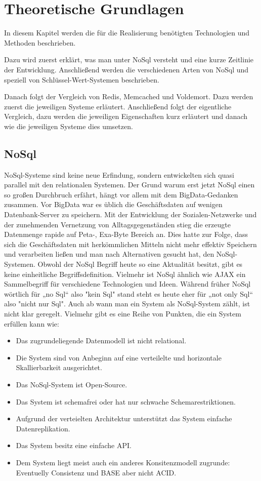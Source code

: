\chapter{Theoretische Grundlagen}
In diesem Kapitel werden die für die Realisierung benötigten Technologien und
Methoden beschrieben.

Dazu wird zuerst erklärt, was man unter NoSql versteht und eine kurze Zeitlinie
der Entwicklung. Anschließend werden die verschiedenen Arten von NoSql und
speziell von Schlüssel-Wert-Systemen beschrieben.

Danach folgt der Vergleich von Redis, Memcached und Voldemort. Dazu werden
zuerst die jeweiligen Systeme erläutert. Anschließend folgt der eigentliche
Vergleich, dazu werden die jeweiligen Eigenschaften kurz erläutert und danach
wie die jeweiligen Systeme dies umsetzen.

\section{NoSql}
NoSql-Systeme sind keine neue Erfindung, sondern entwickelten sich quasi
parallel mit den relationalen Systemen. Der Grund warum erst jetzt NoSql einen
so großen Durchbruch erfährt, hängt vor allem mit dem BigData-Gedanken zusammen.
Vor BigData war es üblich die Geschäftsdaten auf wenigen Datenbank-Server zu
speichern. Mit der Entwicklung der Sozialen-Netzwerke und der zunehmenden
Vernetzung von Alltagsgegenständen stieg die erzeugte Datenmenge rapide auf
Peta-, Exa-Byte Bereich an. Dies hatte zur Folge, dass sich die Geschäftsdaten
mit herkömmlichen Mitteln nicht mehr effektiv Speichern und verarbeiten ließen
und man nach Alternativen gesucht hat, den NoSql-Systemen.
Obwohl der NoSql Begriff heute so eine Aktualität besitzt, gibt es keine
einheitliche Begriffsdefinition. Vielmehr ist NoSql ähnlich wie \gls{AJAX} ein
Sammelbegriff für verschiedene Technologien und Ideen. Während früher NoSql
wörtlich für „no Sql“ also "kein Sql" stand steht es heute eher
für „not only Sql“ also "nicht nur Sql". Auch ab wann man ein System als
NoSql-System zählt, ist nicht klar geregelt. Vielmehr gibt es eine Reihe von
Punkten, die ein System erfüllen kann wie: \cite{Edlich2011}

\begin{itemize}
    \item Das zugrundeliegende Datenmodell ist nicht relational.
    \item Die System sind von Anbeginn auf eine verteilelte und horizontale
        Skallierbarkeit ausgerichtet.
    \item Das NoSql-System ist Open-Source.
    \item Das System ist schemafrei oder hat nur schwache Schemarestriktionen.
    \item Aufgrund der verteielten Architektur unterstützt das System einfache
        Datenreplikation.
    \item Das System besitz eine einfache \gls{API}.
    \item Dem System liegt meist auch ein anderes Konsitenzmodell zugrunde:
        Eventuelly Consistenz und \gls{BASE} aber nicht \gls{ACID}.
\end{itemize}

